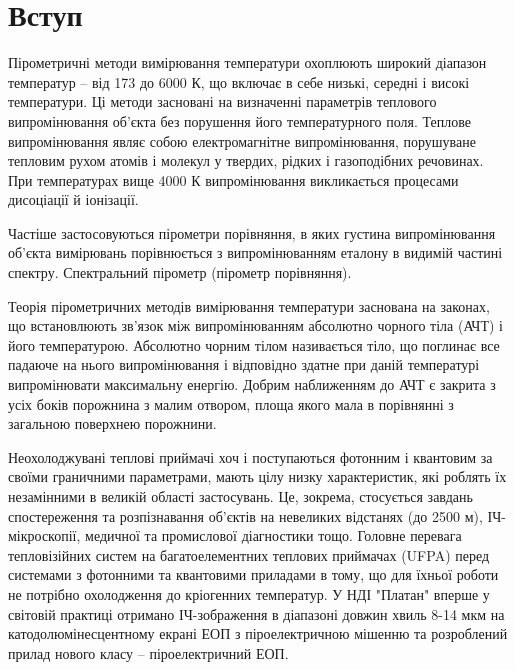 \documentclass[a4paper,14pt]{extreport}
\begin{document}
\newpage

\chapter{Вступ}\par
Пірометричні методи вимірювання температури охоплюють широкий діапазон температур – від 173 до 6000 К, що включає в себе низькі, середні і високі температури. Ці методи засновані на визначенні параметрів теплового випромінювання об'єкта без порушення його температурного поля. Теплове випромінювання являє собою електромагнітне випромінювання, порушуване тепловим рухом атомів і молекул у твердих, рідких і газоподібних речовинах. При температурах вище 4000 К випромінювання викликається процесами дисоціації й іонізації.\par

Частіше застосовуються пірометри порівняння, в яких густина випромінювання об’єкта вимірювань порівнюється з випромінюванням еталону в видимій частині спектру. Спектральний пірометр (пірометр порівняння).\par

Теорія пірометричних методів вимірювання температури заснована на законах, що встановлюють зв'язок між випромінюванням абсолютно чорного тіла (АЧТ) і його температурою. Абсолютно чорним тілом називається тіло, що поглинає все падаюче на нього випромінювання і відповідно здатне при даній температурі випромінювати максимальну енергію. Добрим наближенням до АЧТ є закрита з усіх боків порожнина з малим отвором, площа якого мала в порівнянні з загальною поверхнею порожнини.\par



  Неохолоджувані теплові приймачі хоч і поступаються
фотонним і квантовим за своїми граничними параметрами, мають цілу низку характеристик, які роблять їх незамінними в великій області
застосувань. Це, зокрема, стосується завдань
спостереження та розпізнавання об'єктів на невеликих
відстанях (до 2500 м), ІЧ-мікроскопії, медичної та промислової діагностики тощо. Головне
перевага тепловізійних систем на багатоелементних теплових приймачах (UFPA) перед системами з фотонними та квантовими приладами в тому, що
для їхньої роботи не потрібно охолодження до кріогенних температур. У НДІ "Платан" вперше у світовій
практиці отримано ІЧ-зображення в діапазоні довжин
хвиль 8-14 мкм на катодолюмінесцентному екрані
ЕОП з піроелектричною мішенню та розроблений
прилад нового класу – піроелектричний ЕОП.
\end{document}
